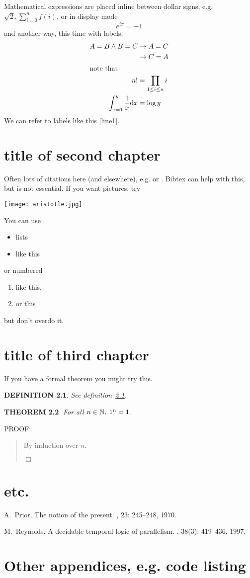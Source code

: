 \documentclass{report}
\newtheorem{theorem}{THEOREM}
\newtheorem{definition}[theorem]{DEFINITION}
\newenvironment{proof}{
PROOF:
\begin{quotation}}{
$\Box$ \end{quotation}}
\newcommand{\nats}{\mbox{\( \mathbb N \)}}
\numberwithin{equation}{section}
\numberwithin{figure}{section}
\numberwithin{table}{section}
\begin{document}
Mathematical expressions are placed inline between dollar signs, e.g. $\sqrt 2, \sum_{i=0}^nf(i)$, or in display mode
\[ e^{i\pi}=-1\] and another way, this time with labels,
\begin{align}
\label{line1} A=B\wedge B=C&\rightarrow A=C\\
&\rightarrow C=A\\
\intertext{note that}
n!&=\prod_{1\leq i\leq n}i \\
\int_{x=1}^y \frac 1 x \mathrm{d}x&=\log y
\end{align}
We can refer to labels like this \eqref{line1}.   

\chapter{title of second chapter}
Often lots of citations here (and elsewhere), e.g. \cite{Rey:D} or \cite[Theorem 2.3]{PriorNOP70}.   Bibtex can help with this, but is not essential. If you want pictures, try

\begin{center}
\texttt{[image: aristotle.jpg]}
\end{center}
You can use 
\begin{itemize}
\item lists
\item like this
\end{itemize}
or numbered
\begin{enumerate}
\item like this,
\item or this
\end{enumerate}
but don't overdo it.
\chapter{title of third chapter}
If you have a formal theorem you might try this.
\begin{definition}\label{def}
See definition~\ref{def}.
\end{definition}
\begin{theorem}
For all $n\in\nats,\; 1^n=1$.
\end{theorem}
\begin{proof}
By induction over $n$.
\end{proof}

\chapter{etc.}
\appendix


\begin{thebibliography}{HHM99}


A.~Prior.
\newblock The notion of the present.
, 23:  245--248, 1970.


M.~Reynolds.
\newblock A decidable temporal logic of parallelism.
, 38(3):  419--436,
  1997.
\end{thebibliography}
\chapter{Other appendices, e.g. code listing}
\end{document}
